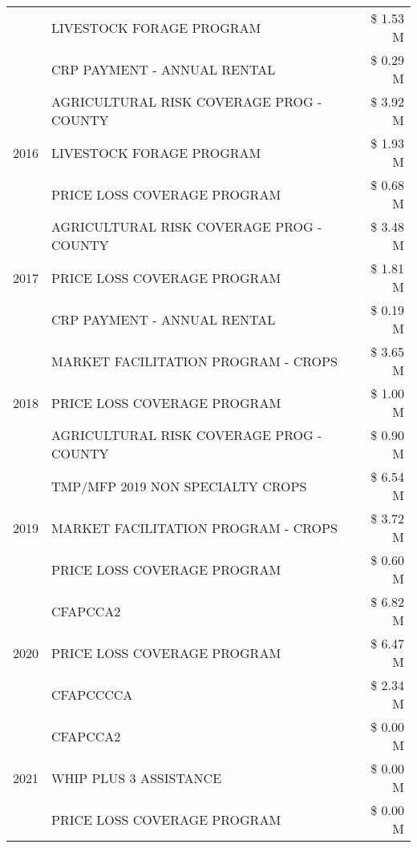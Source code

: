 \begin{tabular}{llr}
 & LIVESTOCK FORAGE PROGRAM & \$ 1.53 M \\
 & CRP PAYMENT - ANNUAL RENTAL & \$ 0.29 M \\
\cline{1-3}
\multirow[t]{3}{*}{2016} & AGRICULTURAL RISK COVERAGE PROG - COUNTY & \$ 3.92 M \\
 & LIVESTOCK FORAGE PROGRAM & \$ 1.93 M \\
 & PRICE LOSS COVERAGE PROGRAM & \$ 0.68 M \\
\cline{1-3}
\multirow[t]{3}{*}{2017} & AGRICULTURAL RISK COVERAGE PROG - COUNTY & \$ 3.48 M \\
 & PRICE LOSS COVERAGE PROGRAM & \$ 1.81 M \\
 & CRP PAYMENT - ANNUAL RENTAL & \$ 0.19 M \\
\cline{1-3}
\multirow[t]{3}{*}{2018} & MARKET FACILITATION PROGRAM - CROPS & \$ 3.65 M \\
 & PRICE LOSS COVERAGE PROGRAM & \$ 1.00 M \\
 & AGRICULTURAL RISK COVERAGE PROG - COUNTY & \$ 0.90 M \\
\cline{1-3}
\multirow[t]{3}{*}{2019} & TMP/MFP 2019 NON SPECIALTY CROPS & \$ 6.54 M \\
 & MARKET FACILITATION PROGRAM - CROPS & \$ 3.72 M \\
 & PRICE LOSS COVERAGE PROGRAM & \$ 0.60 M \\
\cline{1-3}
\multirow[t]{3}{*}{2020} & CFAPCCA2 & \$ 6.82 M \\
 & PRICE LOSS COVERAGE PROGRAM & \$ 6.47 M \\
 & CFAPCCCCA & \$ 2.34 M \\
\cline{1-3}
\multirow[t]{3}{*}{2021} & CFAPCCA2 & \$ 0.00 M \\
 & WHIP PLUS 3 ASSISTANCE & \$ 0.00 M \\
 & PRICE LOSS COVERAGE PROGRAM & \$ 0.00 M \\
\cline{1-3}
\bottomrule
\end{tabular}
